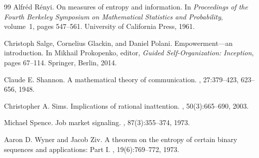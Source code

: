 \documentclass[11pt,a4paper]{article}
\theoremstyle{definition}
\newcommand{\1}{\mathbf 1}
\begin{document}
\begin{thebibliography}{99}
Alfr\'ed R\'enyi.
\newblock On measures of entropy and information.
\newblock In {\em Proceedings of the Fourth Berkeley Symposium on Mathematical Statistics and Probability}, volume~1,
  pages 547--561. University of California Press, 1961.

Christoph Salge, Cornelius Glackin, and Daniel Polani.
\newblock Empowerment---an introduction.
\newblock In Mikhail Prokopenko, editor, {\em Guided Self-Organization: Inception}, pages 67--114. Springer, Berlin,
  2014.

Claude E. Shannon.
\newblock A mathematical theory of communication.
, 27:379--423, 623--656, 1948.

Christopher A. Sims.
\newblock Implications of rational inattention.
, 50(3):665--690, 2003.

Michael Spence.
\newblock Job market signaling.
, 87(3):355--374, 1973.

Aaron D. Wyner and Jacob Ziv.
\newblock A theorem on the entropy of certain binary sequences and applications: Part {I}.
, 19(6):769--772, 1973.

\end{thebibliography}
\end{document}
